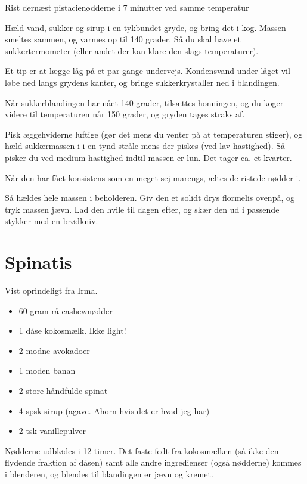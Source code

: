 \documentclass[
  letterpaper,
  DIV=11,
  numbers=noendperiod]{scrreprt}
\providecommand{\tightlist}{%
  \setlength{\itemsep}{0pt}\setlength{\parskip}{0pt}}\usepackage{longtable,booktabs,array}
\begin{document}
Rist dernæst pistacienødderne i 7 minutter ved samme temperatur

Hæld vand, sukker og sirup i en tykbundet gryde, og bring det i kog.
Massen smeltes sammen, og varmes op til 140 grader. Så du skal have et
sukkertermometer (eller andet der kan klare den slags temperaturer).

Et tip er at lægge låg på et par gange undervejs. Kondensvand under
låget vil løbe ned langs grydens kanter, og bringe sukkerkrystaller ned
i blandingen.

Når sukkerblandingen har nået 140 grader, tilsættes honningen, og du
koger videre til temperaturen når 150 grader, og gryden tages straks af.

Pisk æggehviderne luftige (gør det mens du venter på at temperaturen
stiger), og hæld sukkermassen i i en tynd stråle mens der piskes (ved
lav hastighed). Så pisker du ved medium hastighed indtil massen er lun.
Det tager ca. et kvarter.

Når den har fået konsistens som en meget sej marengs, æltes de ristede
nødder i.

Så hældes hele massen i beholderen. Giv den et solidt drys flormelis
ovenpå, og tryk massen jævn. Lad den hvile til dagen efter, og skær den
ud i passende stykker med en brødkniv.

\hypertarget{spinatis}{%
\section{Spinatis}\label{spinatis}}

Vist oprindeligt fra Irma.

\begin{itemize}
\tightlist
\item
  60 gram rå cashewnødder
\item
  1 dåse kokosmælk. Ikke light!
\item
  2 modne avokadoer
\item
  1 moden banan
\item
  2 store håndfulde spinat
\item
  4 spsk sirup (agave. Ahorn hvis det er hvad jeg har)
\item
  2 tsk vanillepulver
\end{itemize}

Nødderne udblødes i 12 timer. Det faste fedt fra kokosmælken (så ikke
den flydende fraktion af dåsen) samt alle andre ingredienser (også
nødderne) kommes i blenderen, og blendes til blandingen er jævn og
kremet.
\end{document}
